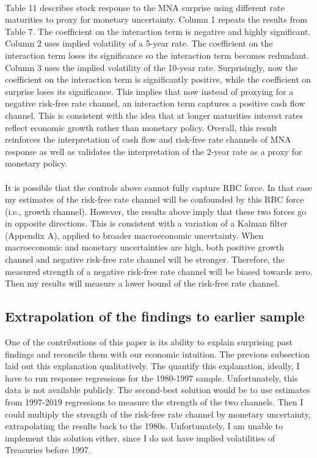 \documentclass[12pt]{article}
\begin{document}
\paragraph{}
Table 11 describes stock response to the MNA surprise using different rate maturities to proxy for monetary uncertainty. Column 1 repeats the results from Table 7. The coefficient on the interaction term is negative and highly significant. Column 2 uses implied volatility of a 5-year rate. The coefficient on the interaction term loses its significance so the interaction term becomes redundant. Column 3 uses the implied volatility of the 10-year rate. Surprisingly, now the coefficient on the interaction term is significantly positive, while the coefficient on surprise loses its significance. This implies that now instead of proxying for a negative risk-free rate channel, an interaction term captures a positive cash flow channel. This is consistent with the idea that at longer maturities interest rates reflect economic growth rather than monetary policy. Overall, this result reinforces the interpretation of cash flow and risk-free rate channels of MNA response as well as validates the interpretation of the 2-year rate as a proxy for monetary policy.
\paragraph{}
It is possible that the controls above cannot fully capture RBC force. In that case my estimates of the risk-free rate channel will be confounded by this RBC force (i.e., growth channel). However, the results above imply that these two forces go in opposite directions. This is consistent with a variation of a Kalman filter (Appendix A), applied to broader macroeconomic uncertainty.  When macroeconomic and monetary uncertainties are high, both positive growth channel and negative risk-free rate channel will be stronger. Therefore, the measured strength of a negative risk-free rate channel will be biased towards zero. Then my results will measure a lower bound of the risk-free rate channel.

\subsection{Extrapolation of the findings to earlier sample} 
\label{sec:Model}

One of the contributions of this paper is its ability to explain surprising past findings and reconcile them with our economic intuition. The previous subsection laid out this explanation qualitatively. The quantify this explanation, ideally, I have to run response regressions for the 1980-1997 sample. Unfortunately, this data is not available publicly. The second-best solution would be to use estimates from 1997-2019 regressions to measure the strength of the two channels. Then I could multiply the strength of the risk-free rate channel by monetary uncertainty, extrapolating the results back to the 1980s. Unfortunately, I am unable to implement this solution either, since I do not have implied volatilities of Treasuries before 1997.
\end{document}
